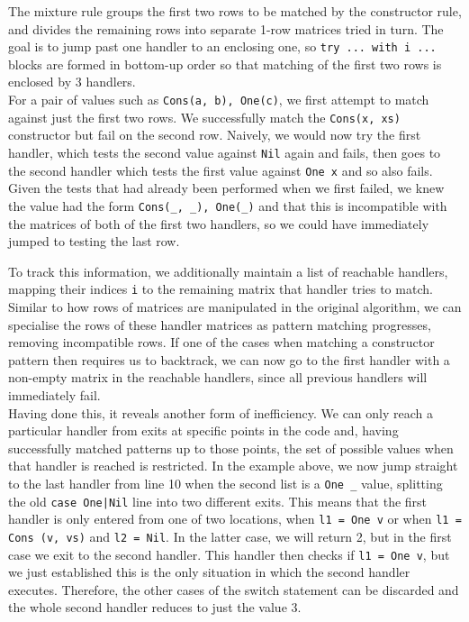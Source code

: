 The mixture rule groups the first two rows to be matched by the constructor rule, and divides the remaining rows into separate 1-row matrices tried in turn. The goal is to jump past one handler to an enclosing one, so \verb|try ... with i ...| blocks are formed in bottom-up order so that matching of the first two rows is enclosed by 3 handlers. \\ %
For a pair of values such as \verb|Cons(a, b), One(c)|, we first attempt to match against just the first two rows. We successfully match the \verb|Cons(x, xs)| constructor but fail on the second row. Naively, we would now try the first handler, which tests the second value against \verb|Nil| again and fails, then goes to the second handler which tests the first value against \verb|One x| and so also fails. Given the tests that had already been performed when we first failed, we knew the value had the form \verb|Cons(_, _), One(_)| and that this is incompatible with the matrices of both of the first two handlers, so we could have immediately jumped to testing the last row.

To track this information, we additionally maintain a list of reachable handlers, mapping their indices \verb|i| to the remaining matrix that handler tries to match. Similar to how rows of matrices are manipulated in the original algorithm, we can specialise the rows of these handler matrices as pattern matching progresses, removing incompatible rows. If one  of the cases when matching a constructor pattern then requires us to backtrack, we can now go to the first handler with a non-empty matrix in the reachable handlers, since all previous handlers will immediately fail. \\


Having done this, it reveals another form of inefficiency. We can only reach a particular handler from exits at specific points in the code and, having successfully matched patterns up to those points, the set of possible values when that handler is reached is restricted. In the example above, we now jump straight to 
the last handler from line 10 when the second list is a \verb|One _| value, splitting the old \verb"case One|Nil" line into two different exits. This means that the first handler is only entered from one of two locations, when \verb|l1 = One v| or when \verb|l1 = Cons (v, vs)| and \verb|l2 = Nil|. In the latter case, we will return 2, but in the first case we exit to the second handler. This handler then checks if \verb|l1 = One v|, but we just established this is the only situation in which the second handler executes. Therefore, the other cases of the switch statement can be discarded and the whole second handler reduces to just the value 3.

